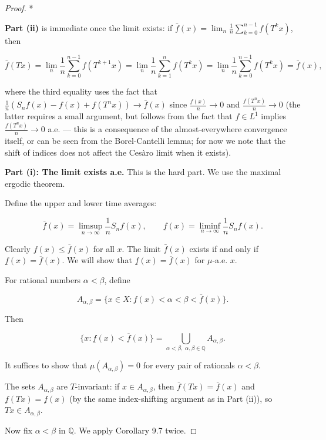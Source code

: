 \begin{proof}
*

\textbf{Part (ii)} is immediate once the limit exists: if $\bar{f}(x) = \lim_n \frac{1}{n}\sum_{k=0}^{n-1} f(T^k x)$, then

\[
\bar{f}(Tx) = \lim_n \frac{1}{n} \sum_{k=0}^{n-1} f(T^{k+1} x) = \lim_n \frac{1}{n} \sum_{k=1}^{n} f(T^k x) = \lim_n \frac{1}{n}\sum_{k=0}^{n-1} f(T^k x) = \bar{f}(x),
\]

where the third equality uses the fact that $\frac{1}{n}(S_n f(x) - f(x) + f(T^n x)) \to \bar{f}(x)$ since $\frac{f(x)}{n} \to 0$ and $\frac{f(T^n x)}{n} \to 0$ (the latter requires a small argument, but follows from the fact that $f \in L^1$ implies $\frac{f(T^n x)}{n} \to 0$ a.e. --- this is a consequence of the almost-everywhere convergence itself, or can be seen from the Borel-Cantelli lemma; for now we note that the shift of indices does not affect the Cesàro limit when it exists).

\textbf{Part (i): The limit exists a.e.} This is the hard part. We use the maximal ergodic theorem.

Define the upper and lower time averages:

\[
\overline{f}(x) = \limsup_{n \to \infty} \frac{1}{n} S_n f(x), \qquad \underline{f}(x) = \liminf_{n \to \infty} \frac{1}{n} S_n f(x).
\]

Clearly $\underline{f}(x) \leq \overline{f}(x)$ for all $x$. The limit $\bar{f}(x)$ exists if and only if $\underline{f}(x) = \overline{f}(x)$. We will show that $\underline{f}(x) = \overline{f}(x)$ for $\mu$-a.e. $x$.

For rational numbers $\alpha < \beta$, define

\[
A_{\alpha, \beta} = \{ x \in X : \underline{f}(x) < \alpha < \beta < \overline{f}(x) \}.
\]

Then

\[
\{ x : \underline{f}(x) < \overline{f}(x) \} = \bigcup_{\alpha < \beta, \; \alpha, \beta \in \mathbb{Q}} A_{\alpha, \beta}.
\]

It suffices to show that $\mu(A_{\alpha, \beta}) = 0$ for every pair of rationals $\alpha < \beta$.

The sets $A_{\alpha, \beta}$ are $T$-invariant: if $x \in A_{\alpha, \beta}$, then $\overline{f}(Tx) = \overline{f}(x)$ and $\underline{f}(Tx) = \underline{f}(x)$ (by the same index-shifting argument as in Part (ii)), so $Tx \in A_{\alpha, \beta}$.

Now fix $\alpha < \beta$ in $\mathbb{Q}$. We apply Corollary 9.7 twice.


\end{proof}
